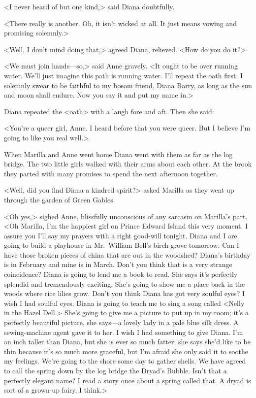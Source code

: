 <I never heard of but one kind,> said Diana doubtfully.

<There really is another. Oh, it isn't wicked at all. It just means vowing and promising solemnly.>

<Well, I don't mind doing that,> agreed Diana, relieved. <How do you do it?>

<We must join hands—so,> said Anne gravely. <It ought to be over running water. We'll just imagine this path is running water. I'll repeat the oath first. I solemnly swear to be faithful to my bosom friend, Diana Barry, as long as the sun and moon shall endure. Now you say it and put my name in.>

Diana repeated the <oath> with a laugh fore and aft. Then she said:

<You're a queer girl, Anne. I heard before that you were queer. But I believe I'm going to like you real well.>

When Marilla and Anne went home Diana went with them as far as the log bridge. The two little girls walked with their arms about each other. At the brook they parted with many promises to spend the next afternoon together.

<Well, did you find Diana a kindred spirit?> asked Marilla as they went up through the garden of Green Gables.

<Oh yes,> sighed Anne, blissfully unconscious of any sarcasm on Marilla's part. <Oh Marilla, I'm the happiest girl on Prince Edward Island this very moment. I assure you I'll say my prayers with a right good-will tonight. Diana and I are going to build a playhouse in Mr.~William Bell's birch grove tomorrow. Can I have those broken pieces of china that are out in the woodshed? Diana's birthday is in February and mine is in March. Don't you think that is a very strange coincidence? Diana is going to lend me a book to read. She says it's perfectly splendid and tremendously exciting. She's going to show me a place back in the woods where rice lilies grow. Don't you think Diana has got very soulful eyes? I wish I had soulful eyes. Diana is going to teach me to sing a song called <Nelly in the Hazel Dell.> She's going to give me a picture to put up in my room; it's a perfectly beautiful picture, she says—a lovely lady in a pale blue silk dress. A sewing-machine agent gave it to her. I wish I had something to give Diana. I'm an inch taller than Diana, but she is ever so much fatter; she says she'd like to be thin because it's so much more graceful, but I'm afraid she only said it to soothe my feelings. We're going to the shore some day to gather shells. We have agreed to call the spring down by the log bridge the Dryad's Bubble. Isn't that a perfectly elegant name? I read a story once about a spring called that. A dryad is sort of a grown-up fairy, I think.>

